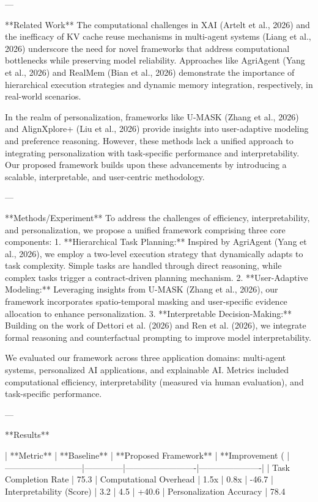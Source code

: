 ---

**Related Work**  
The computational challenges in XAI (Artelt et al., 2026) and the inefficacy of KV cache reuse mechanisms in multi-agent systems (Liang et al., 2026) underscore the need for novel frameworks that address computational bottlenecks while preserving model reliability. Approaches like AgriAgent (Yang et al., 2026) and RealMem (Bian et al., 2026) demonstrate the importance of hierarchical execution strategies and dynamic memory integration, respectively, in real-world scenarios.

In the realm of personalization, frameworks like U-MASK (Zhang et al., 2026) and AlignXplore+ (Liu et al., 2026) provide insights into user-adaptive modeling and preference reasoning. However, these methods lack a unified approach to integrating personalization with task-specific performance and interpretability. Our proposed framework builds upon these advancements by introducing a scalable, interpretable, and user-centric methodology.

---

**Methods/Experiment**  
To address the challenges of efficiency, interpretability, and personalization, we propose a unified framework comprising three core components:  
1. **Hierarchical Task Planning:** Inspired by AgriAgent (Yang et al., 2026), we employ a two-level execution strategy that dynamically adapts to task complexity. Simple tasks are handled through direct reasoning, while complex tasks trigger a contract-driven planning mechanism.  
2. **User-Adaptive Modeling:** Leveraging insights from U-MASK (Zhang et al., 2026), our framework incorporates spatio-temporal masking and user-specific evidence allocation to enhance personalization.  
3. **Interpretable Decision-Making:** Building on the work of Dettori et al. (2026) and Ren et al. (2026), we integrate formal reasoning and counterfactual prompting to improve model interpretability.

We evaluated our framework across three application domains: multi-agent systems, personalized AI applications, and explainable AI. Metrics included computational efficiency, interpretability (measured via human evaluation), and task-specific performance.

---

**Results**  

| **Metric**                | **Baseline** | **Proposed Framework** | **Improvement (%
|---------------------------|--------------|-------------------------|----------------------|
| Task Completion Rate      | 75.3%
| Computational Overhead    | 1.5x         | 0.8x                   | -46.7%
| Interpretability (Score)  | 3.2          | 4.5                    | +40.6%
| Personalization Accuracy  | 78.4%

